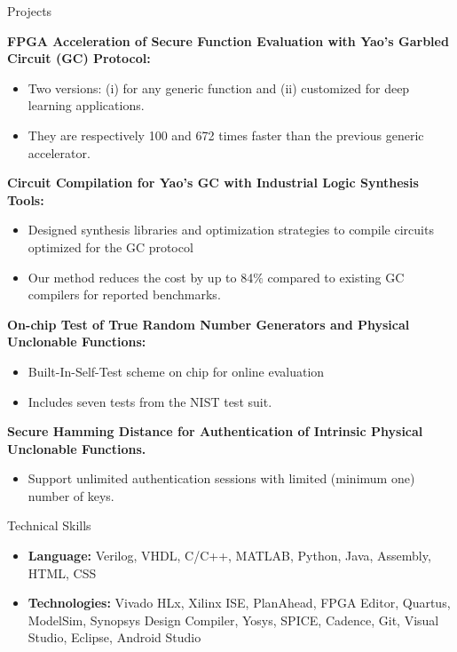 \documentclass[]{mcdowellcv}
\begin{document}
	\begin{cvsection}{Projects}
		\begin{cvsubsection}{}{}{}
		\textbf{FPGA Acceleration of Secure Function Evaluation with Yao's Garbled Circuit (GC) Protocol:}
			\begin{itemize}
				\item  Two versions: (i) for any generic function and (ii) customized for deep learning applications. 
				\item  They are respectively 100 and 672 times faster than the previous generic accelerator. 
			\end{itemize}
			\textbf{Circuit Compilation for Yao's GC with Industrial Logic Synthesis Tools:}
			\begin{itemize}
				\item  Designed synthesis libraries and optimization strategies to compile circuits optimized for the GC protocol
				\item Our method reduces the cost by up to 84$\%$ compared to existing GC compilers for reported benchmarks.
			\end{itemize}
% 			
			\textbf{On-chip Test of True Random Number Generators and Physical Unclonable Functions:}
			\begin{itemize}
			    \item Built-In-Self-Test scheme on chip for online evaluation
				\item  Includes seven tests from the NIST test suit.  
			\end{itemize}
			\textbf{Secure Hamming Distance for Authentication of Intrinsic Physical Unclonable Functions.}
			\begin{itemize}
			    \item Support unlimited authentication sessions with limited (minimum one) number of keys.  
			\end{itemize}
		\end{cvsubsection}
	\end{cvsection}
	
	\begin{cvsection}{Technical Skills}
		\begin{cvsubsection}{}{}{}	
			\begin{itemize}
				\item \textbf{Language:} Verilog, VHDL, C/C++, MATLAB, Python, Java, Assembly, HTML, CSS 
				\item \textbf{Technologies:} Vivado HLx, Xilinx ISE, PlanAhead, FPGA Editor, Quartus, ModelSim, Synopsys Design Compiler, Yosys,  SPICE, Cadence, Git, Visual Studio, Eclipse, Android Studio
			\end{itemize}
		\end{cvsubsection}
	\end{cvsection}
	
\end{document}
